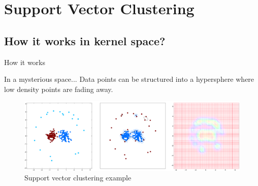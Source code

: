 \section{Support Vector Clustering}
\subsection{How it works in kernel space?}
\begin{frame}{How it works}
\begin{block}{In a mysterious space...}
Data points can be structured into a hypersphere where low density points are fading away.
\end{block}
\vskip20pt
\begin{figure}
\centering
\includegraphics[scale=0.22]{imgs/svn_sample}
\caption{Support vector clustering example}
\end{figure}
\end{frame}

